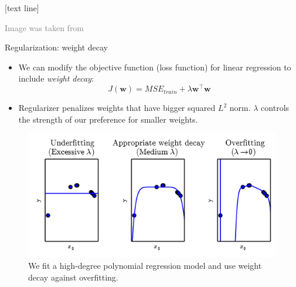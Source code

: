 \documentclass[dvipsnames]{beamer}
\newcommand{\referencefootnote}[1]{\setbeamertemplate{footline}[text line]{%
\parbox{0.9\paperwidth}{\vspace*{-23pt}\tiny{\textcolor{gray}{#1}}\hfill\scriptsize\insertframenumber}}}
\begin{document}
{ \referencefootnote{Image was taken from \cite{Goodfellow_et_al_2016}}
\begin{frame}{Regularization: weight decay}
\begin{itemize}
	\item We can modify the objective function (loss function) for linear regression to include \emph{weight decay}:
	\[
	J(\mathbf{w}) = MSE_{train} + \lambda\mathbf{w}^{\top}\mathbf{w}
	\]
	\item Regularizer penalizes weights that have bigger squared $L^2$ norm. $\lambda$ controls the strength of our preference for smaller weights.
\end{itemize}
	 \begin{figure}
		\center
		\includegraphics[scale=.35]{figures/regularization.png} 
		\caption{We fit a high-degree polynomial regression model and use weight decay against overfitting.}
	\end{figure}
\end{frame}
}
\end{document}
